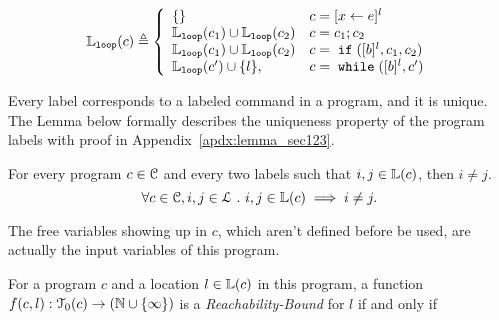 \begin{defn}
  \label{def:loopl}
  $$
  \loopl(c) \triangleq 
  \left\{
    \begin{array}{ll}
      \{\}  & {c} = [{\assign x e}]^{l} \\
      \loopl({c_1}) \cup \loopl({{c_2}})  & {c} = {c_1};{c_2} \\
      \loopl(c_1) \cup \loopl({{c_2}})   & {c} =\eif([\bexpr]^{l}, c_1, c_2) \\
  \loopl(c') \cup \{l\}, &  {c}   = \ewhile ([\bexpr]^{l}, {c}')
  \end{array}
\right.
  $$
  \end{defn}
%
Every label corresponds to a labeled command in a program, and it is unique.
The Lemma below formally describes the uniqueness property of the program labels
with proof in Appendix~\ref{apdx:lemma_sec123}.
\begin{lem}
  \label{lem:label_unique}
  For every program $c \in \mathcal{C}$ and every two labels such that
  $i, j \in \mathbb{L}(c)$, then $i \neq j$.
  \[
    \forall c \in \mathcal{C}, i, j \in \mathcal{L} ~.~ i, j \in \mathbb{L}(c)\implies i \neq j.
    \]
\end{lem}
%
The free variables
showing up in $c$, which aren't defined before be used, are actually the input variables of this program.
%
\begin{defn}
  \label{def:rb}
  For a program ${c}$ and a location $l \in \mathbb{L}(c)$ in this program,
a function $f(c, l) : \mathcal{T}_0(c) \to (\mathbb{N} \cup \{\infty\})$ is a \emph{Reachability-Bound} for $l$ if and only if
\end{defn}
